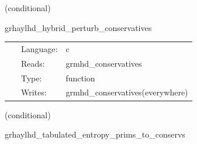 \vspace{5mm}

   (conditional) 

\hspace{5mm} grhaylhd\_hybrid\_perturb\_conservatives 

\hspace{5mm}{\it hybrid version of grhaylhd\_perturb\_conservatives } 


\hspace{5mm}

 \begin{tabular*}{160mm}{cll} 
~ & Language:  & c \\ 
~ & Reads:  & grmhd\_conservatives \\ 
~ & Type:  & function \\ 
~ & Writes:  & grmhd\_conservatives(everywhere) \\ 
\end{tabular*} 


\vspace{5mm}

   (conditional) 

\hspace{5mm} grhaylhd\_tabulated\_entropy\_prims\_to\_conservs 

\hspace{5mm}{\it entropy+tabulated version of grhaylhd\_prims\_to\_conservs } 


\hspace{5mm}

